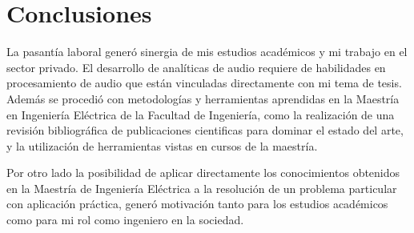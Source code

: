 \documentclass{article}
\begin{document}

\section{Conclusiones}
\label{concl}
La pasantía laboral generó sinergia de mis estudios académicos y mi trabajo en el sector privado. El desarrollo de analíticas de audio requiere de habilidades en procesamiento de audio que están vinculadas directamente con mi tema de tesis. Además se procedió con metodologías y herramientas aprendidas en la Maestría en Ingeniería Eléctrica de la Facultad de Ingeniería, como la realización de una revisión bibliográfica de publicaciones cientificas para dominar el estado del arte, y la utilización de herramientas vistas en cursos de la maestría.
\smallskip

Por otro lado la posibilidad de aplicar directamente los conocimientos obtenidos en la Maestría de Ingeniería Eléctrica a la resolución de un problema particular con aplicación práctica, generó motivación tanto para los estudios académicos como para mi rol como ingeniero en la sociedad.  


\newpage



\end{document}
